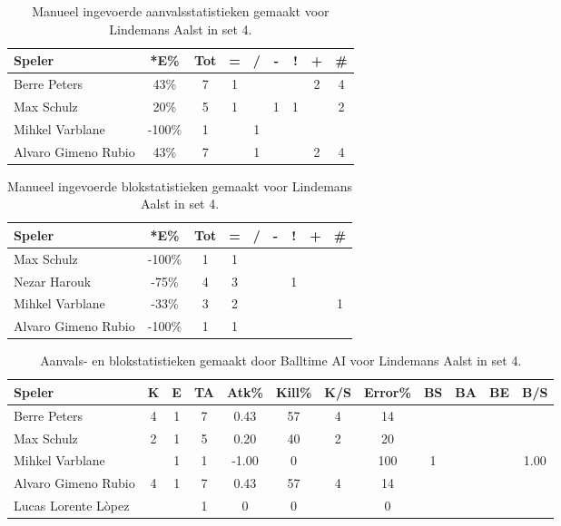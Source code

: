 \begin{table}[ht!]
    \centering
    \scriptsize
    \begin{tabular}{|l|c|c|c|c|c|c|c|c|}
        \hline
        \textbf{Speler} & *E\% & Tot & = & / & - & ! & + & \# \\ \hline
        Berre Peters & 43\% & 7 & 1 &  &  & & 2 & 4 \\ 
        Max Schulz & 20\% & 5 & 1 &  & 1 & 1 & & 2 \\ 
        Mihkel Varblane & -100\% & 1 &  & 1 &  &  &  & \\ 
        Alvaro Gimeno Rubio & 43\% & 7 &  & 1 & & & 2 & 4 \\ \hline
    \end{tabular}
    \caption[Manueel ingevoerde aanvalsstatistieken gemaakt Lindemans Aalst in set 4]{\label{tab:PL3AttAalstMan4}Manueel ingevoerde aanvalsstatistieken gemaakt voor Lindemans Aalst in set 4.}
\end{table}

\begin{table}[ht!]
    \centering
    \scriptsize
    \begin{tabular}{|l|c|c|c|c|c|c|c|c|}
        \hline
        \textbf{Speler} & *E\% & Tot & = & / & - & ! & + & \# \\ \hline
        Max Schulz & -100\% & 1 & 1 &  &  &  &  & \\
        Nezar Harouk & -75\% & 4 & 3 & &  & 1 &  & \\ 
        Mihkel Varblane & -33\% & 3 & 2 &  &  & &  & 1 \\ 
        Alvaro Gimeno Rubio & -100\% & 1 & 1 &  &  &  &  & \\  \hline
    \end{tabular}
    \caption[Manueel ingevoerde blokstatistieken gemaakt Lindemans Aalst in set 4]{\label{tab:PL3BlockAalstMan4}Manueel ingevoerde blokstatistieken gemaakt voor Lindemans Aalst in set 4.}
\end{table}

\begin{table}[ht!]
  \centering
  \scriptsize
  \begin{tabular}{|l|c|c|c|c|c|c|c|c|c|c|c|} \hline
    \textbf{Speler} &  K & E & TA & Atk\% & Kill\% & K/S & Error\% & BS & BA & BE & B/S\\ \hline
    Berre Peters & 4 & 1 & 7 & 0.43 & 57 & 4 & 14 &  &  & & \\
    Max Schulz & 2 & 1 & 5 & 0.20 & 40 & 2 & 20 &  &  & & \\
    Mihkel Varblane &  & 1 & 1 & -1.00 & 0 &  & 100 & 1 & & & 1.00 \\
    Alvaro Gimeno Rubio & 4 & 1 & 7 & 0.43 & 57 & 4 & 14 &  &  & &\\
    Lucas Lorente Lòpez &  &  & 1 & 0 & 0 &  & 0 &  &  & & \\ \hline
  \end{tabular}
  \caption[Aanvals- en blokstatistieken gemaakt door Balltime AI voor Lindemans Aalst in set 4]{\label{tab:PL3AttBlockAalstAI4}Aanvals- en blokstatistieken gemaakt door Balltime AI voor Lindemans Aalst in set 4.}
\end{table}
